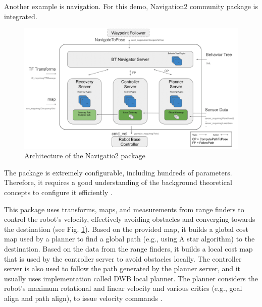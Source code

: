 Another example is navigation.
For this demo, Navigation2 community package is integrated.  
\begin{figure}[H]
    \centering
    \includegraphics[width=\textwidth]{demos/figures/navigation_overview.png}
    \caption[Architecture of the Navigatio2 package]{Architecture of the Navigatio2 package\footnotemark}
    \label{fig:demos:navigation_overview}
\end{figure}

The package is extremely configurable, including hundreds of parameters.
Therefore, it requires a good understanding of the background theoretical concepts to configure it efficiently \cite{zheng_ros_nodate}.

This package uses transforms, maps, and measurements from range finders to control the robot's velocity, effectively avoiding obstacles and converging towards the destination (see Fig. \ref{fig:demos:navigation_overview}).
Based on the provided map, it builds a global cost map used by a planner to find a global path (e.g., using A star algorithm) to the destination.
Based on the data from the range finders, it builds a local cost map that is used by the controller server to avoid obstacles locally.
The controller server is also used to follow the path generated by the planner server, and it usually uses implementation called DWB local planner.
The planner considers the robot's maximum rotational and linear velocity and various critics (e.g., goal align and path align), to issue velocity commands \cite{macenski_marathon_2020-1}. 

